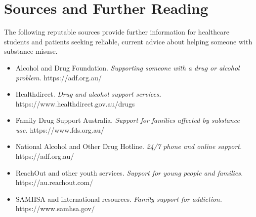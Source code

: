 \section*{Sources and Further Reading}
The following reputable sources provide further information for healthcare students and patients seeking reliable, current advice about helping someone with substance misuse.

\begin{itemize}
    \item Alcohol and Drug Foundation. \textit{Supporting someone with a drug or alcohol problem.} https://adf.org.au/
    \item Healthdirect. \textit{Drug and alcohol support services.} https://www.healthdirect.gov.au/drugs
    \item Family Drug Support Australia. \textit{Support for families affected by substance use.} https://www.fds.org.au/
    \item National Alcohol and Other Drug Hotline. \textit{24/7 phone and online support.} https://adf.org.au/
    \item ReachOut and other youth services. \textit{Support for young people and families.} https://au.reachout.com/
    \item SAMHSA and international resources. \textit{Family support for addiction.} https://www.samhsa.gov/
\end{itemize}
